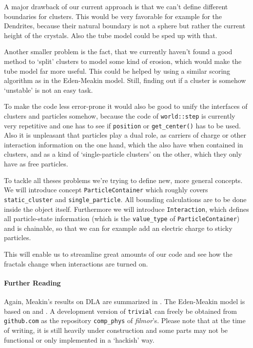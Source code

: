 \documentclass[twocolumn, 10pt]{scrartcl}
\begin{document}
            A major drawback of our current approach is that we can't define different boundaries for clusters. This
            would be very favorable for example for the Dendrites, because their natural boundary is not a sphere but
            rather the current height of the crystals. Also the tube model could be sped up with that.

            Another smaller problem is the fact, that we currently haven't found a good method to `split' clusters to
            model some kind of erosion, which would make the tube model far more useful. This could be helped by using a
            similar scoring algorithm as in the Eden-Meakin model. Still, finding out if a cluster is somehow `unstable'
            is not an easy task.

            To make the code less error-prone it would also be good to unify the interfaces of clusters and particles
            somehow, because the code of \lstinline'world::step' is currently very repetitive and one has to see if
            \lstinline'position' or \lstinline'get_center()' has to be used. Also it is unpleasant that particles play
            a dual role, as carriers of charge or other interaction information on the one hand, which the also have
            when contained in clusters, and as a kind of `single-particle clusters' on the other, which they only
            have as free particles.

            To tackle all theses problems we're trying to define new, more general concepts. We will introduce concept
            \lstinline'ParticleContainer' which roughly covers \lstinline'static_cluster' and
            \lstinline'single_particle'. All bounding calculations are to be done inside the object itself. Furthermore
            we will introduce \lstinline'Interaction', which defines all particle-state information (which is the
            \lstinline'value_type' of \lstinline'ParticleContainer') and is chainable, so that we can for example add
            an electric charge to sticky particles.

            This will enable us to streamline great amounts of our code and see how the fractals change when
            interactions are turned on.

        {\small
            \paragraph{Further Reading}
            Again, Meakin's results on DLA are summarized in \cite{src-meakin1}. The Eden-Meakin model is based
            on \cite{src-eden} and \cite{src-meakin-eden}.
            A development version of \texttt{trivial} can freely be obtained from \texttt{github.com} as the
            repository \texttt{comp\_phys} of \emph{filmor}'s. Please note that at the time of writing, it is still
            heavily under construction and some parts may not be functional or only implemented in a `hackish' way.
        }            
\end{document}
